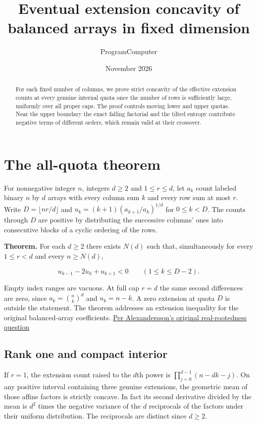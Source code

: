 \documentclass[11pt]{article}
\title{Eventual extension concavity of balanced arrays in fixed dimension}
\author{ProgramComputer}
\date{November 2026}
\begin{document}
\maketitle
\begin{abstract}
For each fixed number of columns, we prove strict concavity of the
effective extension counts at every genuine internal quota once the
number of rows is sufficiently large, uniformly over all proper caps.
The proof controls moving lower and upper quotas. Near the upper
boundary the exact falling factorial and the tilted entropy contribute
negative terms of different orders, which remain valid at their
crossover.
\end{abstract}
\section{The all-quota theorem}\label{sec:proof}

For nonnegative integer $n$, integers $d\ge2$ and $1\le r\le d$, let $a_k$ count
labeled binary $n$ by $d$ arrays with every column sum $k$ and every row
sum at most $r$. Write $D=\lfloor nr/d\rfloor$ and
$u_k=(k+1)(a_{k+1}/a_k)^{1/d}$ for $0\le k<D$.
The counts through $D$ are positive by distributing the successive columns' ones into consecutive blocks of a cyclic ordering of the rows.

\textbf{Theorem.} For each $d\ge2$ there exists $N(d)$ such that, simultaneously for every $1\le r<d$ and every $n\ge N(d)$,

\begin{equation*}
u_{k-1}-2u_k+u_{k+1}<0
\qquad (1\le k\le D-2).
\end{equation*}

Empty index ranges are vacuous. At full cap $r=d$ the same second differences are zero, since $a_k=\binom nk^d$ and $u_k=n-k$. A zero extension at quota $D$ is outside the statement. The theorem addresses an extension inequality for the original balanced-array coefficients. \href{https://www.symmetricfunctions.com/realRootedOpenProblems.htm#conjBalancedArrays}{Per Alexandersson's original real-rootedness question}

\subsection{Rank one and compact interior}

If $r=1$, the extension count raised to the $d$th power is
$\prod_{j=0}^{d-1}(n-dk-j)$. On any positive interval containing three genuine extensions, the geometric mean of those affine factors is strictly concave. In fact its second derivative divided by the mean is $d^2$ times the negative variance of the $d$ reciprocals of the factors under their uniform distribution. The reciprocals are distinct since $d\ge2$.
\end{document}
